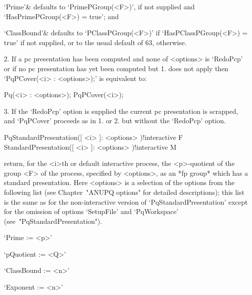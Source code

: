 \endlist
\beginitems

`Prime'& 
defaults to `PrimePGroup(<F>)', if not supplied and  `HasPrimePGroup(<F>)
= true'; and

`ClassBound'&
defaults to `PClassPGroup(<F>)' if `HasPClassPGroup(<F>) =  true'  if  not
supplied, or to the usual default of 63, otherwise.

\enditems
\beginlist%

\item{2.}
If a pc presentation has been computed and none of <options> is `RedoPcp'
or if no pc presentation has yet been computed but 1. does not apply then
`PqPCover(<i> : <options>);' is equivalent to:

Pq(<i> : <options>);
PqPCover(<i>);

\item{3.}
If the `RedoPcp' option  is  supplied  the  current  pc  presentation  is
scrapped, and `PqPCover'  proceeds  as  in  1.  or  2.  but  without  the
`RedoPcp' option.

\endlist

\>PqStandardPresentation([ <i> ]: <options> )!{interactive} F
\>StandardPresentation([ <i> ]: <options> )!{interactive} M

return, for the  <i>th  or  default  interactive  {\ANUPQ}  process,  the
<p>-quotient of the group <F> of the process, specified by <options>,  as
an *fp group* which has a standard  presentation.  Here  <options>  is  a
selection of the options from  the  following  list  (see  Chapter~"ANUPQ
options" for detailed descriptions); this list is the  same  as  for  the
non-interactive  version  of  `PqStandardPresentation'  except  for   the
omission     of      options      `SetupFile'      and      `PqWorkspace'
(see~"PqStandardPresentation").

\beginlist%

\item{}`Prime := <p>'

\item{}`pQuotient := <Q>'

\item{}`ClassBound := <n>'

\item{}`Exponent := <n>'

